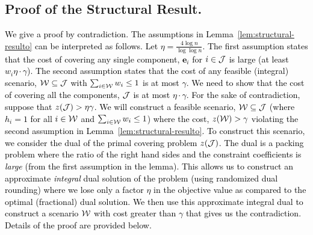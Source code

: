 \documentclass[moor]{informs1}              %
\newcommand{\mb}[1]{\ensuremath{\boldsymbol{#1}}}
\newcommand*{\red}{\textcolor{black}}
\begin{document}
\subsection{Proof of the Structural Result.} \label{section:claims}


\red{We give a proof by contradiction. %
The assumptions in Lemma~\ref{lem:structural-resulto} can be interpreted as follows. Let $\eta  =  \frac{4 \log n }{\log \log n}$. The first assumption states that the cost of covering any single component, $\mb e_i$ for $i \in {\cal J}$ is large (at least $w_i \eta \cdot \gamma$). The second assumption states that the cost of any feasible (integral) scenario, ${\cal W} \subseteq {\cal J}$ with $\sum_{i \in {\cal W}} w_i \leq 1$ is at most $\gamma$. We need to show that the cost of covering all the components, ${\cal J}$ is at most $\eta\cdot \gamma$. For the sake of contradiction, suppose that  $z({\cal J})  > \eta \gamma$. We will construct a feasible scenario, ${\cal W} \subseteq {\cal J}$ (where $h_i =1$ for all $i \in {\cal W}$ and $\sum_{i \in {\cal W}} w_i \leq 1$) where the cost, $z({\cal W}) > \gamma$ violating the second assumption in Lemma~\ref{lem:structural-resulto}. To construct this scenario, we consider the dual of the primal covering problem $z({\cal J})$. The dual is a packing problem where the ratio of the right hand sides and the constraint coefficients is {\em large} (from the first assumption in the lemma). This allows us to construct an approximate {\em integral} dual solution of the problem (using randomized dual rounding) where we lose only a factor $\eta$ in the objective value as compared to the optimal (fractional) dual solution. We then use this approximate integral dual to construct a scenario ${\cal W}$ with cost greater than $\gamma$ that gives us the contradiction. Details of the proof are provided below.}
\end{document}
